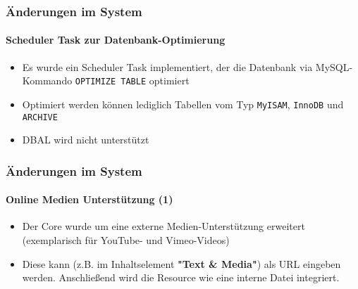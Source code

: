 
\begin{frame}[fragile]
	\frametitle{Änderungen im System}
	\framesubtitle{Scheduler Task zur Datenbank-Optimierung}

	\begin{itemize}

		\item Es wurde ein Scheduler Task implementiert, der die Datenbank via MySQL-Kommando
			\texttt{OPTIMIZE TABLE} optimiert

		\item Optimiert werden können lediglich Tabellen vom Typ\newline
			\texttt{MyISAM}, \texttt{InnoDB} und \texttt{ARCHIVE}

		\item DBAL wird nicht unterstützt

	\end{itemize}

\end{frame}


\begin{frame}[fragile]
	\frametitle{Änderungen im System}
	\framesubtitle{Online Medien Unterstützung (1)}

	\begin{itemize}

		\item Der Core wurde um eine externe Medien-Unterstützung erweitert\newline
			\small
				(exemplarisch für YouTube- und Vimeo-Videos)
			\normalsize

		\item Diese kann (z.B. im Inhaltselement \textbf{"Text \& Media"}) als URL
			eingeben werden. Anschließend wird die Resource wie eine interne Datei integriert.

	\end{itemize}

\end{frame}

